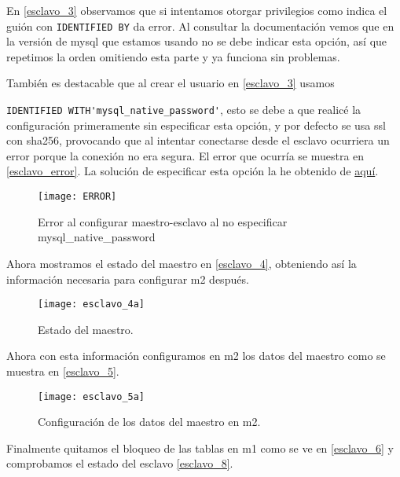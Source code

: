 En \eqref{esclavo_3} observamos que si intentamos otorgar privilegios como indica el guión con \verb|IDENTIFIED BY| da error. Al consultar la documentación vemos que en la versión de mysql que estamos usando no se debe indicar esta opción, así que repetimos la orden omitiendo esta parte y ya funciona sin problemas.

También es destacable que al crear el usuario en \eqref{esclavo_3} usamos

\verb|IDENTIFIED WITH'mysql_native_password'|, esto se debe a que realicé la configuración primeramente sin especificar esta opción, y por defecto se usa ssl con sha256, provocando que al intentar conectarse desde el esclavo ocurriera un error porque la conexión no era segura. El error que ocurría se muestra en \eqref{esclavo_error}. La solución de especificar esta opción la he obtenido de \href{https://stdworkflow.com/927/2061-authentication-plugin-caching-sha2-password-reported-error-authentication-require-secure-connection)}{aquí}.

\begin{figure}[h!]
\begin{center}
\caption{Error al configurar maestro-esclavo al no especificar mysql\_native\_password}
\label{esclavo_error}
\texttt{[image: ERROR]}
\end{center}
\end{figure}

Ahora mostramos el estado del maestro en \eqref{esclavo_4}, obteniendo así la información necesaria para configurar m2 después.

\begin{figure}[h!]
\begin{center}
\caption{Estado del maestro.}
\label{esclavo_4}
\texttt{[image: esclavo\_4a]}
\end{center}
\end{figure}

Ahora con esta información configuramos en m2 los datos del maestro como se muestra en \eqref{esclavo_5}.

\begin{figure}[h!]
\begin{center}
\caption{Configuración de los datos del maestro en m2.}
\label{esclavo_5}
\texttt{[image: esclavo\_5a]}
\end{center}
\end{figure}

Finalmente quitamos el bloqueo de las tablas en m1 como se ve en \eqref{esclavo_6} y comprobamos el estado del esclavo \eqref{esclavo_8}.

